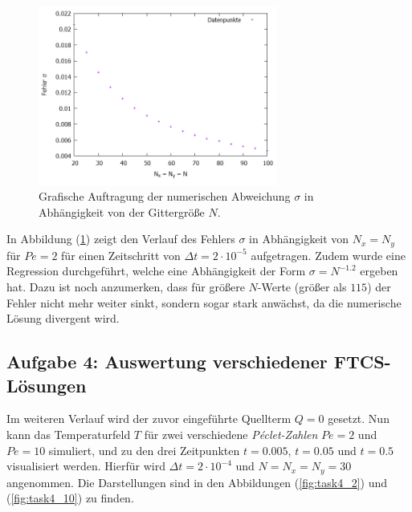 \documentclass[12pt,a4paper,titlepage,headinclude,bibtotoc]{scrartcl}
\begin{document}
\begin{figure}[H]
 \centering
   \includegraphics[width=0.7\textwidth]{res/task3.png}
   \caption{Grafische Auftragung der numerischen Abweichung $\sigma$ in Abhängigkeit von der Gittergröße $N$.}
 \label{fig:task3}
\end{figure}

In Abbildung (\ref{fig:task3}) zeigt den Verlauf des Fehlers $\sigma$ in Abhängigkeit von $N_x = N_y$ für $Pe = 2$ für einen Zeitschritt von $\Delta t = 2 \cdot 10^{-5}$ aufgetragen.
Zudem wurde eine Regression durchgeführt, welche eine Abhängigkeit der Form $\sigma = N^{-1.2}$ ergeben hat. Dazu ist noch anzumerken, dass für größere $N$-Werte (größer als $115$) der Fehler nicht mehr weiter sinkt, sondern sogar stark anwächst, da die numerische Lösung divergent wird.


\subsection{Aufgabe 4: Auswertung verschiedener FTCS-Lösungen}
\label{sec:task4}
Im weiteren Verlauf wird der zuvor eingeführte Quellterm $Q=0$ gesetzt. Nun kann das Temperaturfeld $T$ für zwei verschiedene \textit{Péclet-Zahlen} $Pe = 2$ und $Pe = 10$ simuliert,
und zu den drei Zeitpunkten $t = 0.005$, $t = 0.05$ und $t=0.5$ visualisiert werden. Hierfür wird $\Delta t = 2 \cdot 10^{-4}$ und $N=N_x=N_y = 30$ angenommen. Die Darstellungen sind in den Abbildungen (\ref{fig:task4_2}) und (\ref{fig:task4_10}) zu finden.
\end{document}
